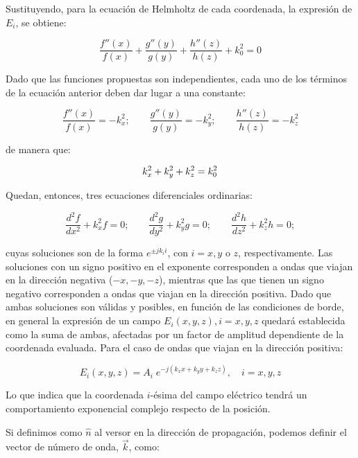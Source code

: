 Sustituyendo, para la ecuación de Helmholtz de cada coordenada, la expresión de $E_i$, se obtiene:

\begin{equation}
	\frac{f''(x)}{f(x)} + \frac{g''(y)}{g(y)} + \frac{h''(z)}{h(z)} + k_0^2 = 0
\end{equation}

Dado que las funciones propuestas son independientes, cada uno de los términos de la ecuación anterior deben dar lugar a una constante:

\begin{equation}
	\frac{f''(x)}{f(x)} = -k_x^2; \qquad \frac{g''(y)}{g(y)} = -k_y^2; \qquad \frac{h''(z)}{h(z)} = -k_z^2
\end{equation}

de manera que:

\begin{equation}
	\label{eq:numero_de_onda}
	k_x^2 + k_y^2 + k_z^2 = k_0^2 \\
\end{equation}

Quedan, entonces, tres ecuaciones diferenciales ordinarias:

\begin{equation}
	\frac{d^2 f}{dx^2} + k_x^2 f = 0; \qquad \frac{d^2 g}{dy^2} + k_y^2 g = 0; \qquad \frac{d^2 h}{dz^2} + k_z^2 h = 0;
\end{equation}

cuyas soluciones son de la forma $e^{\pm j k_i i}$, con $i = x, y$ o $z$, respectivamente. Las soluciones con un signo positivo en el exponente corresponden a ondas que viajan en la dirección negativa ($-x, -y, -z$), mientras que las que tienen un signo negativo corresponden a ondas que viajan en la dirección positiva. Dado que ambas soluciones son válidas y posibles, en función de las condiciones de borde, en general la expresión de un campo $E_i (x, y, z), i=x,y,z$ quedará establecida como la suma de ambas, afectadas por un factor de amplitud dependiente de la coordenada evaluada. Para el caso de ondas que viajan en la dirección positiva:

\begin{equation}
	E_i(x,y,z) = A_i \;e^{-j(k_x x + k_y y + k_z z)}, \quad i=x,y,z
\end{equation}

Lo que indica que la coordenada $i$-ésima del campo eléctrico tendrá un comportamiento exponencial complejo respecto de la posición. 

Si definimos como $\hat{n}$ al versor en la dirección de propagación, podemos definir el vector de número de onda, $\vec{k}$, como:

